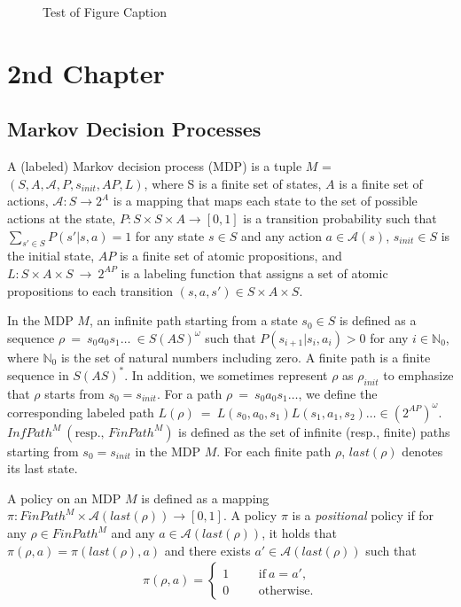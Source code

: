 \documentclass[a4j,12pt,oneside,openany,english,dvipdfmx]{jsbook}
\begin{document}
\begin{figure}
	\caption{Test of Figure Caption}
\end{figure}


\chapter{2nd Chapter}

\section{Markov Decision Processes}

\begin{definition}
A (labeled) Markov decision process (MDP) is a tuple $M$ = $(S, A, \mathcal{A}, P, s_{init}, AP, L)$, where S is a finite set of states, $A$ is a finite set of actions, $\mathcal{A} : S \rightarrow 2^A$ is a mapping that maps each state to the set of possible actions at the state, $P:S \times S \times A \rightarrow [0,1]$ is a transition probability such that $\sum_{s' \in S} P(s'|s,a) = 1$ for any state $s \in S$ and any action $a \in \mathcal{A}(s) $, $s_{init} \in S$ is the initial state, $AP$ is a finite set of atomic propositions, and $L : S \times A \times S\ \rightarrow\ 2^{AP}$ is a labeling function that assigns a set of atomic propositions to each transition $(s, a, s') \in S \times A \times S$.

In the MDP $M$, an infinite path starting from a state $s_0 \in S$ is defined as a sequence $\rho\ =\ s_0a_0s_1 \ldots\ \in S (A S)^{\omega}$ such that $P(s_{i+1}|s_i, a_i) > 0$ for any $ i \in \mathbb{N}_0$, where $\mathbb{N}_0$ is the set of natural numbers including zero.  A finite path is a finite sequence in $S (A S)^*$. In addition, we sometimes represent $\rho$ as $\rho_{init}$ to emphasize that $\rho$ starts from $s_0 = s_{init}$.
For a path $\rho\ =\ s_0a_0s_1 \ldots$, we define the corresponding labeled path $L(\rho)\ =\ L(s_0,a_0,s_1)L(s_1,a_1,s_2) \ldots \in (2^{AP})^{\omega}$. $InfPath^{M}\ ( \text{resp., }FinPath^{M})$ is defined as the set of infinite (resp., finite) paths starting from $s_0=s_{init}$ in the MDP $M$. For each finite path $\rho$, $last(\rho)$ denotes its last state.
\label{MDP}
\end{definition}

\begin{definition}[Policy]
  A policy on an MDP $M$ is defined as a mapping $\pi:FinPath^{M} \times \mathcal{A}(last(\rho)) \rightarrow [0,1]$. A policy $\pi$ is a {\it positional} policy if for any $ \rho \in FinPath^{M}$ and any $ a \in \mathcal{A}(last(\rho))$, it holds that $\pi(\rho, a)=\pi(last(\rho),a)$ and there exists $ a' \in \mathcal{A}(last(\rho))$ such that
  \begin{align*}
    \pi(\rho, a) =
    \left\{
    \begin{aligned}
      1 &   & &\text{if}\ a=a',\\
      0 &   & &\text{otherwise}.
    \end{aligned}
    \right.
  \end{align*}
\end{definition}
\end{document}
